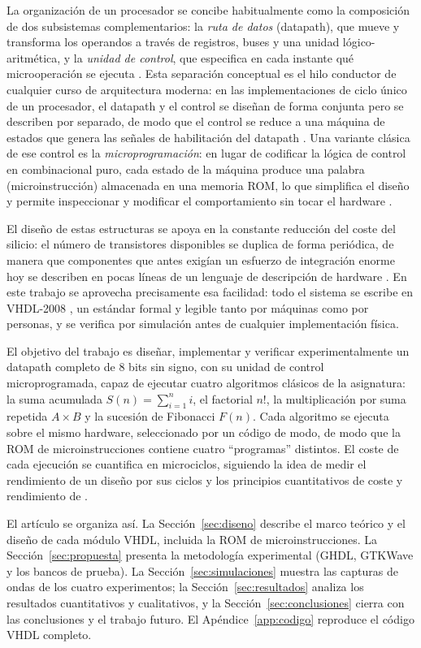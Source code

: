\documentclass[llncs]{llncs}
\begin{document}
La organización de un procesador se concibe habitualmente como la
composición de dos subsistemas complementarios: la \emph{ruta de datos}
(datapath), que mueve y transforma los operandos a través de registros,
buses y una unidad lógico-aritmética, y la \emph{unidad de control}, que
especifica en cada instante qué microoperación se ejecuta
\cite{hamacher2002co}. Esta separación conceptual es el hilo conductor de
cualquier curso de arquitectura moderna: en las implementaciones de ciclo
único de un procesador, el datapath y el control se diseñan de forma
conjunta pero se describen por separado, de modo que el control se reduce
a una máquina de estados que genera las señales de habilitación del
datapath \cite{patterson2017cod}. Una variante clásica de ese control es
la \emph{microprogramación}: en lugar de codificar la lógica de control en
combinacional puro, cada estado de la máquina produce una palabra
(microinstrucción) almacenada en una memoria ROM, lo que simplifica el
diseño y permite inspeccionar y modificar el comportamiento sin tocar el
hardware \cite{bryant2015csapp}.

El diseño de estas estructuras se apoya en la constante reducción del
coste del silicio: el número de transistores disponibles se duplica de
forma periódica, de manera que componentes que antes exigían un esfuerzo
de integración enorme hoy se describen en pocas líneas de un lenguaje de
descripción de hardware \cite{wiki-moore}. En este trabajo se aprovecha
precisamente esa facilidad: todo el sistema se escribe en VHDL-2008
\cite{ieee1076_2008}, un estándar formal y legible tanto por máquinas como
por personas, y se verifica por simulación antes de cualquier
implementación física.

El objetivo del trabajo es diseñar, implementar y verificar
experimentalmente un datapath completo de 8 bits sin signo, con su unidad
de control microprogramada, capaz de ejecutar cuatro algoritmos clásicos
de la asignatura: la suma acumulada $S(n) = \sum_{i=1}^{n} i$, el
factorial $n!$, la multiplicación por suma repetida $A \times B$ y la
sucesión de Fibonacci $F(n)$. Cada algoritmo se ejecuta sobre el mismo
hardware, seleccionado por un código de modo, de modo que la ROM de
microinstrucciones contiene cuatro ``programas'' distintos. El coste de
cada ejecución se cuantifica en microciclos, siguiendo la idea de medir
el rendimiento de un diseño por sus ciclos \cite{stallings2015coa} y los
principios cuantitativos de coste y rendimiento de
\cite{hennessy2017qa}.

El artículo se organiza así. La Sección~\ref{sec:diseno} describe el
marco teórico y el diseño de cada módulo VHDL, incluida la ROM de
microinstrucciones. La Sección~\ref{sec:propuesta} presenta la
metodología experimental (GHDL, GTKWave y los bancos de prueba). La
Sección~\ref{sec:simulaciones} muestra las capturas de ondas de los cuatro
experimentos; la Sección~\ref{sec:resultados} analiza los resultados
cuantitativos y cualitativos, y la Sección~\ref{sec:conclusiones} cierra
con las conclusiones y el trabajo futuro. El Apéndice~\ref{app:codigo}
reproduce el código VHDL completo.
\end{document}
